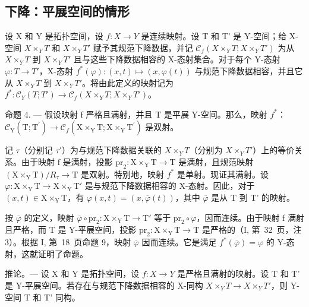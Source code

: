 \subsection{下降：平展空间的情形}

设 X 和 Y 是拓扑空间，设 \(f\colon X\to Y\) 是连续映射。设 T 和 T' 是 Y-空间；给 X-空间 \(X\times_{Y}T\) 和 \(X\times_{Y}T'\) 赋予其规范下降数据，并记 \(\mathcal{C}_{f}(X\times_{Y}T;X\times_{Y}T')\) 为从 \(X\times_{Y}T\) 到 \(X\times_{Y}T'\) 且与这些下降数据相容的 X-态射集合。对于每个 Y-态射 \(\varphi\colon T\to T'\)，X-态射 \(f^{*}(\varphi)\colon(x,t)\mapsto(x,\varphi(t))\) 与规范下降数据相容，并且它从 \(X\times_{Y}T\) 到 \(X\times_{Y}T'\)。将由此定义的映射记为 \(f^{*}\colon\mathcal{C}_{Y}(T;T')\to\mathcal{C}_{f}(X\times_{Y}T;X\times_{Y}T')\)。

命题 4. --- 假设映射 f 严格且满射，并且 T 是平展 Y-空间。那么，映射 \(f^{*}\)：\(\mathcal{C}_{\mathrm{Y}}(\mathrm{T};\mathrm{T}^{\prime}) \to \mathcal{C}_{f}(\mathrm{X} \times_{\mathrm{Y}} \mathrm{T}; \mathrm{X} \times_{\mathrm{Y}} \mathrm{T}^{\prime})\) 是双射。

记 \(\tau\)（分别记 \(\tau'\)）为与规范下降数据关联的 \(X\times_{Y}T\)（分别为 \(X\times_{Y}T'\)）上的等价关系。由于映射 f 是满射，投影 \(\mathrm{pr}_2\colon \mathrm{X}\times_{\mathrm{Y}}\mathrm{T} \to \mathrm{T}\) 是满射，且规范映射 \((\mathrm{X}\times_{\mathrm{Y}}\mathrm{T})/R_{\tau} \to \mathrm{T}\) 是双射。特别地，映射 \(f^*\) 是单射。现证其满射。设 \(\varphi\colon \mathrm{X}\times_{\mathrm{Y}}\mathrm{T} \to \mathrm{X}\times_{\mathrm{Y}}\mathrm{T}'\) 是与规范下降数据相容的 X-态射。因此，对于 \((x,t) \in \mathrm{X}\times_{\mathrm{Y}}\mathrm{T}\)，有 \(\varphi(x,t) = (x,\overline{\varphi}(t))\)，其中 \(\overline{\varphi}\) 是从 T 到 T' 的映射。

按 \(\overline{\varphi}\) 的定义，映射 \(\overline{\varphi} \circ \mathrm{pr}_2: \mathrm{X} \times_{\mathrm{Y}} \mathrm{T} \to \mathrm{T}'\) 等于 \(\mathrm{pr}_2 \circ \varphi\)，因而连续。由于映射 f 满射且严格，而 T 是 Y-平展空间，投影 \(\mathrm{pr}_2: \mathrm{X} \times_{\mathrm{Y}} \mathrm{T} \to \mathrm{T}\) 是严格的（I, 第~32~页，注 3）。根据 I, 第~18~页命题 9，映射 \(\overline{\varphi}\) 因而连续。它是满足 \(f^*(\overline{\varphi}) = \varphi\) 的 Y-态射，这就证明了命题。

推论。--- 设 X 和 Y 是拓扑空间，设 \(f: X \rightarrow Y\) 是严格且满射的映射。设 T 和 T' 是 Y-平展空间。若存在与规范下降数据相容的 X-同构 \(X \times_{Y} T \rightarrow X \times_{Y} T'\)，则 Y-空间 T 和 T' 同构。

